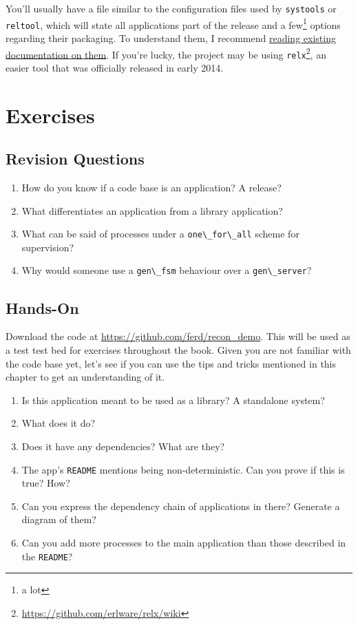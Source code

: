 \documentclass[11pt, oneside]{book}   	%
\newcommand{\filename}[1]{\Verb`#1`}
\newcommand{\app}[1]{\Verb`#1`}
\newcommand{\module}[1]{\Verb`#1`}
\newcommand{\term}[1]{\Verb`#1`}
\begin{document}
You'll usually have a file similar to the configuration files used by \module{systools} or \module{reltool}, which will state all applications part of the release and a few\footnote{a lot} options regarding their packaging. To understand them, I recommend \href{http://learnyousomeerlang.com/release-is-the-word}{reading existing documentation on them}. If you're lucky, the project may be using \app{relx}\footnote{\href{https://github.com/erlware/relx/wiki}{https://github.com/erlware/relx/wiki}}, an easier tool that was officially released in early 2014.


\section{Exercises}

\subsection{Revision Questions}

\begin{enumerate}
	\item How do you know if a code base is an application? A release?
	\item What differentiates an application from a library application?
	\item What can be said of processes under a \term{one\_for\_all} scheme for supervision?
	\item Why would someone use a \module{gen\_fsm} behaviour over a \module{gen\_server}?
\end{enumerate}

\subsection{Hands-On}

Download the code at \href{https://github.com/ferd/recon\_demo}{https://github.com/ferd/recon\_demo}. This will be used as a test test bed for exercises throughout the book. Given you are not familiar with the code base yet, let's see if you can use the tips and tricks mentioned in this chapter to get an understanding of it.

\begin{enumerate}
	\item Is this application meant to be used as a library? A standalone system?
	\item What does it do?
	\item Does it have any dependencies? What are they?
	\item The app's \filename{README} mentions being non-deterministic. Can you prove if this is true? How?
	\item Can you express the dependency chain of applications in there? Generate a diagram of them?
	\item Can you add more processes to the main application than those described in the \filename{README}? 
\end{enumerate}
\end{document}
